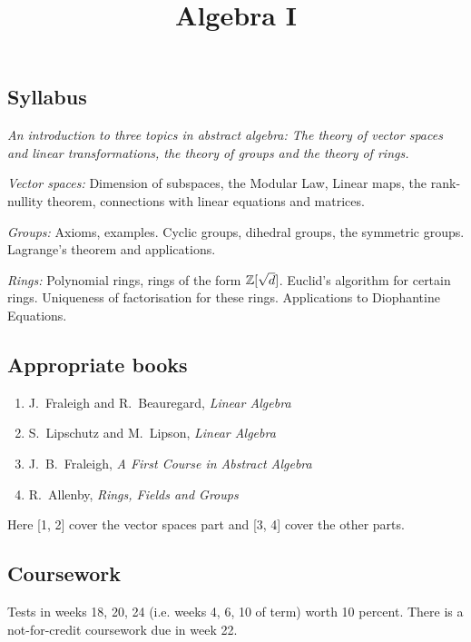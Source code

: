 \documentclass[10pt]{scrartcl}
\title{Algebra I}
\begin{document}
{


\subsection*{Syllabus}

\textit{An introduction to three topics in abstract algebra: The theory of vector spaces and linear
transformations, the theory of groups and the theory of rings.}


\emph{Vector spaces:} Dimension of subspaces, the Modular Law, Linear maps, the rank-nullity theorem, connections with linear equations and matrices.

\emph{Groups:} Axioms, examples. Cyclic groups, dihedral groups, the symmetric groups. Lagrange’s  theorem and applications.

\emph{Rings:}  Polynomial rings, rings of the form $\mathbb{Z}[\sqrt{d}]$. Euclid’s algorithm for certain rings. Uniqueness of factorisation for these rings. Applications to Diophantine Equations.

\subsection*{Appropriate books}

{\shortskip
\begin{enumerate}[1)]
\item J.~Fraleigh and R.~Beauregard, \emph{Linear Algebra}

\item S.~Lipschutz and M.~Lipson, \emph{Linear Algebra}

\item J.~B.~Fraleigh, \emph{A First Course in Abstract Algebra}

\item R.~Allenby, \emph{Rings, Fields and Groups}
\end{enumerate}

Here [1, 2] cover the vector spaces part and [3, 4] cover the other parts.

\subsection*{Coursework}

Tests in weeks 18, 20, 24 (i.e. weeks 4, 6, 10 of term) worth 10 percent. There is a not-for-credit coursework due in week 22.

}}

\TableofContents
\end{document}
